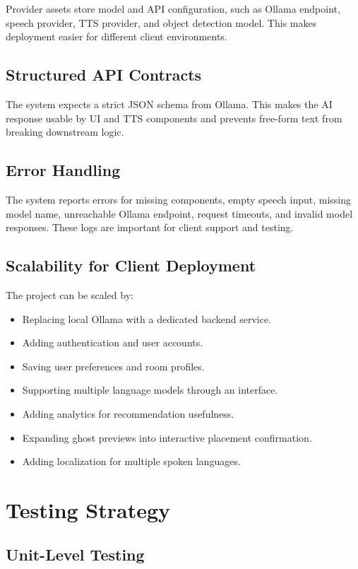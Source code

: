 \documentclass[12pt,a4paper]{article}
\begin{document}
Provider assets store model and API configuration, such as Ollama endpoint, speech provider, TTS provider, and object detection model. This makes deployment easier for different client environments.

\subsection{Structured API Contracts}

The system expects a strict JSON schema from Ollama. This makes the AI response usable by UI and TTS components and prevents free-form text from breaking downstream logic.

\subsection{Error Handling}

The system reports errors for missing components, empty speech input, missing model name, unreachable Ollama endpoint, request timeouts, and invalid model responses. These logs are important for client support and testing.

\subsection{Scalability for Client Deployment}

The project can be scaled by:

\begin{itemize}
    \item Replacing local Ollama with a dedicated backend service.
    \item Adding authentication and user accounts.
    \item Saving user preferences and room profiles.
    \item Supporting multiple language models through an interface.
    \item Adding analytics for recommendation usefulness.
    \item Expanding ghost previews into interactive placement confirmation.
    \item Adding localization for multiple spoken languages.
\end{itemize}

\section{Testing Strategy}

\subsection{Unit-Level Testing}
\end{document}
